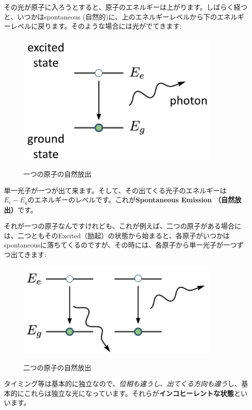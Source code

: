 その光が原子に入ろうとすると、原子のエネルギーは上がります。しばらく経つと、いつかはspontaneous (自然的)に、上のエネルギーレベルから下のエネルギーレベルに戻ります。そのような場合には光がでてきます:
\begin{figure}[H]
    \centering
    \includegraphics[width=0.9\textwidth]{lesson5/one_atom.pdf}
    \label{図: 1}
    \caption{一つの原子の自然放出}
\end{figure}
単一光子が一つが出て来ます。そして、その出てくる光子のエネルギーは$E_e-E_g$のエネルギーのレベルです。これが\textbf{Spontaneous Emission （自然放出）}です。

それが一つの原子なんですけれども、これが例えば、二つの原子がある場合には、二つともそのExcited（励起）の状態から始まると、各原子がいつかはspontaneousに落ちてくるのですが、その時には、各原子から単一光子が一つずつ出てきます:
\begin{figure}[H]
    \centering
    \includegraphics[width=0.9\textwidth]{lesson5/two_atoms.pdf}
    \label{図: 1}
    \caption{二つの原子の自然放出}
\end{figure}
タイミング等は基本的に独立なので、\textit{位相も違うし}、\textit{出てくる方向も違う}し、基本的にこれらは独立な光になっています。それらが\textbf{インコヒーレントな状態}といいます。


